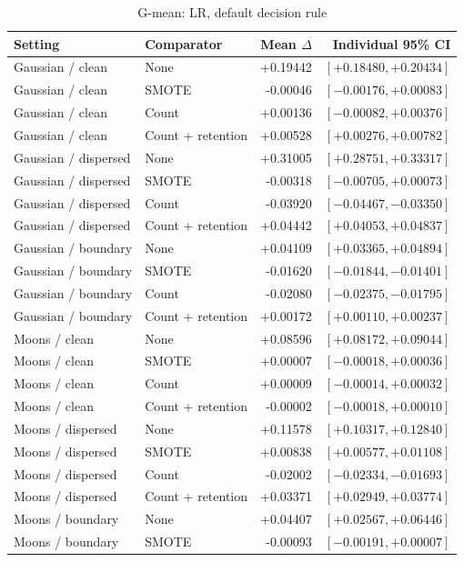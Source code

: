 \begin{table}[htbp]
\caption{G-mean: LR, default decision rule}
\centering\small
\begin{tabular}{llrr}
\hline
Setting & Comparator & Mean $\Delta$ & Individual 95\% CI\\
\hline
Gaussian / clean & None & +0.19442 & $[+0.18480, +0.20434]$ \\
Gaussian / clean & SMOTE & -0.00046 & $[-0.00176, +0.00083]$ \\
Gaussian / clean & Count & +0.00136 & $[-0.00082, +0.00376]$ \\
Gaussian / clean & Count + retention & +0.00528 & $[+0.00276, +0.00782]$ \\
Gaussian / dispersed & None & +0.31005 & $[+0.28751, +0.33317]$ \\
Gaussian / dispersed & SMOTE & -0.00318 & $[-0.00705, +0.00073]$ \\
Gaussian / dispersed & Count & -0.03920 & $[-0.04467, -0.03350]$ \\
Gaussian / dispersed & Count + retention & +0.04442 & $[+0.04053, +0.04837]$ \\
Gaussian / boundary & None & +0.04109 & $[+0.03365, +0.04894]$ \\
Gaussian / boundary & SMOTE & -0.01620 & $[-0.01844, -0.01401]$ \\
Gaussian / boundary & Count & -0.02080 & $[-0.02375, -0.01795]$ \\
Gaussian / boundary & Count + retention & +0.00172 & $[+0.00110, +0.00237]$ \\
Moons / clean & None & +0.08596 & $[+0.08172, +0.09044]$ \\
Moons / clean & SMOTE & +0.00007 & $[-0.00018, +0.00036]$ \\
Moons / clean & Count & +0.00009 & $[-0.00014, +0.00032]$ \\
Moons / clean & Count + retention & -0.00002 & $[-0.00018, +0.00010]$ \\
Moons / dispersed & None & +0.11578 & $[+0.10317, +0.12840]$ \\
Moons / dispersed & SMOTE & +0.00838 & $[+0.00577, +0.01108]$ \\
Moons / dispersed & Count & -0.02002 & $[-0.02334, -0.01693]$ \\
Moons / dispersed & Count + retention & +0.03371 & $[+0.02949, +0.03774]$ \\
Moons / boundary & None & +0.04407 & $[+0.02567, +0.06446]$ \\
Moons / boundary & SMOTE & -0.00093 & $[-0.00191, +0.00007]$ \\

\end{tabular}
\end{table}
